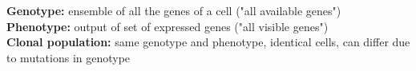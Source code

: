 \textbf{Genotype:}
ensemble of all the genes of a cell ("all available genes")\\
\textbf{Phenotype:}
output of set of expressed genes ("all visible genes")\\
\textbf{Clonal population:}
same genotype and phenotype, identical cells, 
can differ due to mutations in genotype

